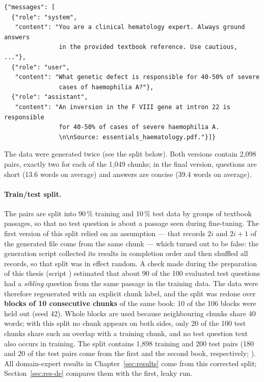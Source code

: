 \begin{lstlisting}
{"messages": [
  {"role": "system",
   "content": "You are a clinical hematology expert. Always ground answers
               in the provided textbook reference. Use cautious, ..."},
  {"role": "user",
   "content": "What genetic defect is responsible for 40-50% of severe
               cases of haemophilia A?"},
  {"role": "assistant",
   "content": "An inversion in the F VIII gene at intron 22 is responsible
               for 40-50% of cases of severe haemophilia A.
               \n\nSource: essentials_haematology.pdf."}]}
\end{lstlisting}

The data were generated twice (see the split below). Both versions contain 2{,}098 pairs, exactly two for each of the 1{,}049 chunks; in the final version, questions are short (13.6 words on average) and answers are concise (39.4 words on average).

\paragraph{Train/test split.} The pairs are split into 90\,\% training and 10\,\% test data by groups of textbook passages, so that no test question is about a passage seen during fine-tuning. The first version of this split relied on an assumption --- that records $2i$ and $2i{+}1$ of the generated file come from the same chunk --- which turned out to be false: the generation script collected its results in completion order and then shuffled all records, so that split was in effect random. A check made during the preparation of this thesis (script ) estimated that about 90 of the 100 evaluated test questions had a \emph{sibling} question from the same passage in the training data. The data were therefore regenerated with an explicit chunk label, and the split was redone over \textbf{blocks of 10 consecutive chunks} of the same book: 10 of the 106 blocks were held out (seed 42). Whole blocks are used because neighbouring chunks share 40 words; with this split no chunk appears on both sides, only 20 of the 100 test chunks share such an overlap with a training chunk, and no test question text also occurs in training. The split contains 1{,}898 training and 200 test pairs (180 and 20 of the test pairs come from the first and the second book, respectively; ). All domain-expert results in Chapter~\ref{sec:results} come from this corrected split; Section~\ref{sec:res-de} compares them with the first, leaky run.

